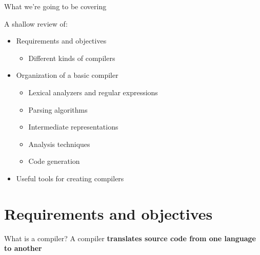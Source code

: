 \documentclass[../index.tex]{subfiles}
\begin{document}

\renewcommand{\sectiontitle}{Before we begin}
\renewcommand{\currenttitle}{What we're going to be covering}
\begin{frame}{\currenttitle}
  
  A shallow review of:

  \only<+->{}
  \begin{itemize}
    \item<+-> Requirements and objectives
      \begin{itemize}
        \item Different kinds of compilers
      \end{itemize}
    \item<+-> Organization of a basic compiler
      \begin{itemize}
        \item Lexical analyzers and regular expressions
        \item Parsing algorithms
        \item Intermediate representations
        \item Analysis techniques
        \item Code generation
      \end{itemize}
    \item<+-> Useful tools for creating compilers
  \end{itemize}
\end{frame}

\renewcommand{\sectiontitle}{Requirements and objectives}
\section{\sectiontitle}

\renewcommand{\currenttitle}{What is a compiler?}
\begin{frame}[fragile]{\currenttitle}
  A compiler \textbf{translates source code from one language to another} \\[2em]

\end{frame}
\end{document}
